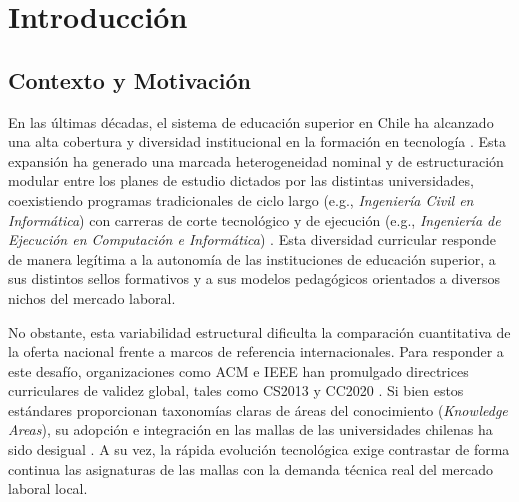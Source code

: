 \section{Introducción}
\label{cap:introduction}

\subsection{Contexto y Motivación}
\label{sec:context_motivation}

En las últimas décadas, el sistema de educación superior en Chile ha alcanzado una alta cobertura y diversidad institucional en la formación en tecnología \citep{subsecretaria_de_educacion_superior_evidencias_2025}. Esta expansión ha generado una marcada heterogeneidad nominal y de estructuración modular entre los planes de estudio dictados por las distintas universidades, coexistiendo programas tradicionales de ciclo largo (e.g., \textit{Ingeniería Civil en Informática}) con carreras de corte tecnológico y de ejecución (e.g., \textit{Ingeniería de Ejecución en Computación e Informática}) \citep{subsecretaria_de_educacion_superior_evidencias_2025,latuz_pina_2024}. Esta diversidad curricular responde de manera legítima a la autonomía de las instituciones de educación superior, a sus distintos sellos formativos y a sus modelos pedagógicos orientados a diversos nichos del mercado laboral.

No obstante, esta variabilidad estructural dificulta la comparación cuantitativa de la oferta nacional frente a marcos de referencia internacionales. Para responder a este desafío, organizaciones como ACM e IEEE han promulgado directrices curriculares de validez global, tales como CS2013 y CC2020 \citep{cc2020_task_force_computing_2020}. Si bien estos estándares proporcionan taxonomías claras de áreas del conocimiento (\textit{Knowledge Areas}), su adopción e integración en las mallas de las universidades chilenas ha sido desigual \citep{diaz-quezada_rediseno_2019}. A su vez, la rápida evolución tecnológica exige contrastar de forma continua las asignaturas de las mallas con la demanda técnica real del mercado laboral local.

